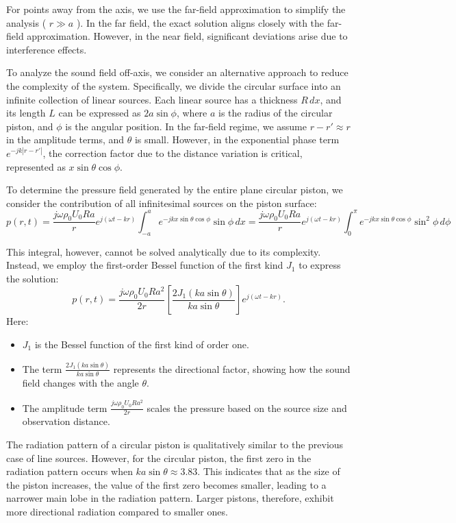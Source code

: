 \documentclass[a4paper]{article}
\begin{document}
For points away from the axis, we use the far-field approximation to simplify the analysis ( \(r \gg a \) ). In the far field, the exact solution aligns closely with the far-field approximation. However, in the near field, significant deviations arise due to interference effects.

To analyze the sound field off-axis, we consider an alternative approach to reduce the complexity of the system. Specifically, we divide the circular surface into an infinite collection of linear sources. Each linear source has a thickness \( R \, dx \), and its length \( L \) can be expressed as \( 2a \sin \phi \), where \( a \) is the radius of the circular piston, and \( \phi \) is the angular position. In the far-field regime, we assume \( r - r' \approx r \) in the amplitude terms, and \( \theta \) is small. However, in the exponential phase term \( e^{-j k |r - r'|} \), the correction factor due to the distance variation is critical, represented as \( x \sin \theta \cos \phi \). 

To determine the pressure field generated by the entire plane circular piston, we consider the contribution of all infinitesimal sources on the piston surface: 
\[
p(r, t) = \frac{j \omega \rho_0 U_0 R a}{r} e^{j (\omega t - k r)} 
\int_{-a}^{a} e^{-j k x \sin \theta \cos \phi} \sin \phi \, dx
= \frac{j \omega \rho_0 U_0 R a}{r} e^{j (\omega t - k r)} 
\int_{0}^{\pi} e^{-j k x \sin \theta \cos \phi} \sin^2 \phi \, d\phi

\]


This integral, however, cannot be solved analytically due to its complexity. Instead, we employ the first-order Bessel function of the first kind \( J_1 \) to express the solution:
\[
p(r, t)  = \frac{j \omega \rho_0 U_0 R a^2}{2 r} \left[ \frac{2 J_1(k a \sin \theta)}{k a \sin \theta} \right] e^{j(\omega t - k r)}.
\]
Here:
\begin{itemize}
    \item  \( J_1 \) is the Bessel function of the first kind of order one.
\item The term \( \frac{2 J_1(k a \sin \theta)}{k a \sin \theta} \) represents the directional factor, showing how the sound field changes with the angle \( \theta \).
\item The amplitude term \( \frac{j \omega \rho_0 U_0 R a^2}{2 r} \) scales the pressure based on the source size and observation distance.
\end{itemize}


The radiation pattern of a circular piston is qualitatively similar to the previous case of line sources. However, for the circular piston, the first zero in the radiation pattern occurs when \( k a \sin \theta \approx 3.83 \). This indicates that as the size of the piston increases, the value of the first zero becomes smaller, leading to a narrower main lobe in the radiation pattern. Larger pistons, therefore, exhibit more directional radiation compared to smaller ones.
\end{document}
